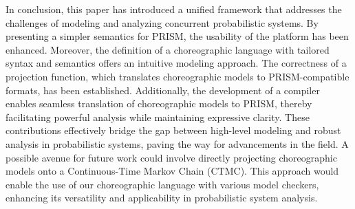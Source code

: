 In conclusion, this paper has introduced a unified framework that addresses the challenges of modeling and analyzing concurrent probabilistic systems. By presenting a simpler semantics for PRISM, the usability of the platform has been enhanced. Moreover, the definition of a choreographic language with tailored syntax and semantics offers an intuitive modeling approach. The correctness of a projection function, which translates choreographic models to PRISM-compatible formats, has been established. Additionally, the development of a compiler enables seamless translation of choreographic models to PRISM, thereby facilitating powerful analysis while maintaining expressive clarity. These contributions effectively bridge the gap between high-level modeling and robust analysis in probabilistic systems, paving the way for advancements in the field. 
A possible avenue for future work could involve directly projecting choreographic models onto a Continuous-Time Markov Chain (CTMC). This approach would enable the use of our choreographic language with various model checkers, enhancing its versatility and applicability in probabilistic system analysis.


